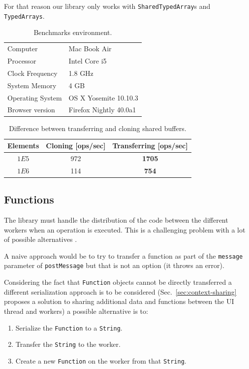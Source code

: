 \documentclass[runningheads,a4paper]{llncs}
\begin{document}
For that reason our library only works with \verb+SharedTypedArray+s and \verb+TypedArrays+.

\begin{table}
  \centering
  \begin{tabular}{|l|l|}
    \hline
    Computer & Mac Book Air \\
    Processor & Intel Core i5 \\
    Clock Frequency & 1.8 GHz \\
    System Memory & 4 GB \\
    Operating System & OS X Yosemite 10.10.3 \\
    Browser version & Firefox Nightly 40.0a1 \\
    \hline
  \end{tabular}
  \caption{Benchmarks environment.}
  \label{tab:env}
\end{table}

\begin{table}
  \centering
  \begin{tabular}{|c|c|c|}
    \hline
    Elements & Cloning [ops/sec] & Transferring [ops/sec] \\
    \hline
    \(1E5\) & 972 & \textbf{1705} \\
    \(1E6\) & 114 & \textbf{754} \\
    \hline
  \end{tabular}
  \caption{Difference between transferring and cloning shared buffers.}
  \label{tab:transf-vs-clone}
\end{table}

\subsection{Functions}
The library must handle the distribution of the code between the different workers when an operation is executed. This is a challenging problem with a lot of possible alternatives \cite{cloud-haskell} \cite{distributed-scheme}.

A naive approach would be to try to transfer a function as part of the \verb+message+ parameter of \verb+postMessage+ but that is not an option (it throws an error).

Considering the fact that \verb+Function+ objects cannot be directly transferred a different serialization approach is to be considered (Sec.~\ref{sec:context-sharing} proposes a solution to sharing additional data and functions between the UI thread and workers) a possible alternative is to:
\begin{enumerate}
  \item Serialize the \verb+Function+ to a \verb+String+.
  \item Transfer the \verb+String+ to the worker.
  \item Create a new \verb+Function+ on the worker from that \verb+String+.
\end{enumerate}
\end{document}
